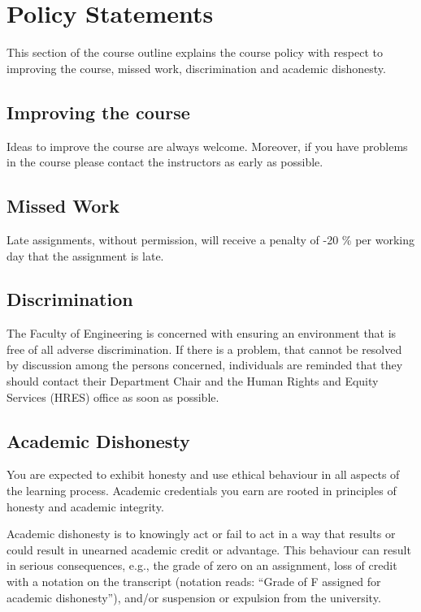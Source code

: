 \documentclass[12pt]{article}
\begin{document}
\section {Policy Statements}

This section of the course outline explains the course policy with respect to
improving the course, missed work, discrimination and academic dishonesty.

\subsection {Improving the course}

Ideas to improve the course are always welcome.  Moreover, if you have problems
in the course please contact the instructors as early as possible.

\subsection {Missed Work}

Late assignments, without permission, will receive a penalty of -20 \% per
working day that the assignment is late.

\subsection {Discrimination}

The Faculty of Engineering is concerned with ensuring an environment
that is free of all adverse discrimination.  If there is a problem,
that cannot be resolved by discussion among the persons concerned,
individuals are reminded that they should contact their Department
Chair and the Human Rights and Equity Services (HRES) office as soon
as possible.

\subsection {Academic Dishonesty}

You are expected to exhibit honesty and use ethical behaviour in all aspects of
the learning process.  Academic credentials you earn are rooted in principles of
honesty and academic integrity.

Academic dishonesty is to knowingly act or fail to act in a way that results or
could result in unearned academic credit or advantage.  This behaviour can result
in serious consequences, e.g., the grade of zero on an assignment, loss of
credit with a notation on the transcript (notation reads: ``Grade of F assigned
for academic dishonesty''), and/or suspension or expulsion from the university.
\end{document}
